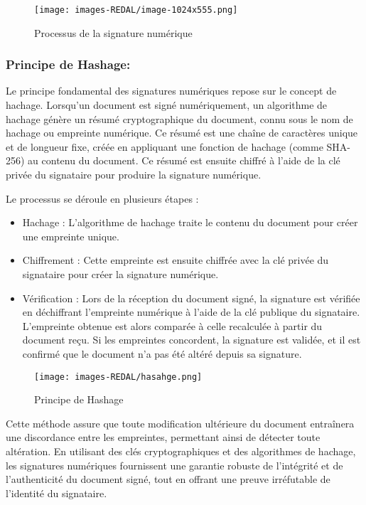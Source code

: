 \begin{figure}[H]
\begin{center}
\texttt{[image: images-REDAL/image-1024x555.png]}
\end{center}
\caption{Processus de la signature numérique}
\end{figure}

\subsubsection{Principe de Hashage:}
Le principe fondamental des signatures numériques repose sur le concept de hachage. Lorsqu'un document est signé numériquement, un algorithme de hachage génère un résumé cryptographique du document, connu sous le nom de hachage ou empreinte numérique. Ce résumé est une chaîne de caractères unique et de longueur fixe, créée en appliquant une fonction de hachage (comme SHA-256) au contenu du document. Ce résumé est ensuite chiffré à l'aide de la clé privée du signataire pour produire la signature numérique.

Le processus se déroule en plusieurs étapes :
\begin{itemize}

\item Hachage :
L'algorithme de hachage traite le contenu du document pour créer une empreinte unique.
\item Chiffrement : 
Cette empreinte est ensuite chiffrée avec la clé privée du signataire pour créer la signature numérique.
\item Vérification : 
Lors de la réception du document signé, la signature est vérifiée en déchiffrant l'empreinte numérique à l'aide de la clé publique du signataire. L'empreinte obtenue est alors comparée à celle recalculée à partir du document reçu. Si les empreintes concordent, la signature est validée, et il est confirmé que le document n'a pas été altéré depuis sa signature.
\end{itemize}


\begin{figure}[H]
\begin{center}
\texttt{[image: images-REDAL/hasahge.png]}
\end{center}
\caption{Principe de Hashage}
\end{figure}

Cette méthode assure que toute modification ultérieure du document entraînera une discordance entre les empreintes, permettant ainsi de détecter toute altération. En utilisant des clés cryptographiques et des algorithmes de hachage, les signatures numériques fournissent une garantie robuste de l'intégrité et de l'authenticité du document signé, tout en offrant une preuve irréfutable de l'identité du signataire.

